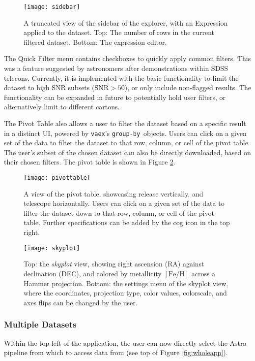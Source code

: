 \documentclass[a4paper,10pt,twocolumn]{article}
\newcommand{\vaex}{\texttt{vaex}}
\begin{document}
\begin{figure}[tp]
	\centering
	\texttt{[image: sidebar]}
	\caption{A truncated view of the sidebar of the explorer, with an Expression applied to the dataset. Top: The number of rows in the current filtered dataset. Bottom: The expression editor.}
	\label{fig:sidebar}
\end{figure}

The Quick Filter menu contains checkboxes to quickly apply common filters. This was a feature suggested by astronomers after demonstrations within SDSS telecons. Currently, it is implemented with the basic functionality to limit the dataset to high SNR subsets ($\mathrm{SNR} >50$), or only include non-flagged results. The functionality can be expanded in future to potentially hold user filters, or alternatively limit to different cartons.

The Pivot Table also allows a user to filter the dataset based on a specific result in a distinct UI, powered by \vaex's \texttt{group-by}\, objects. Users can click on a given set of the data to filter the dataset to that row, column, or cell of the pivot table. The user's subset of the chosen dataset can also be directly downloaded, based on their chosen filters. The pivot table is shown in Figure \ref{fig:pivottable}.


\begin{figure}[tp]
	\centering
	\texttt{[image: pivottable]}
	\caption{A view of the pivot table, showcasing release vertically, and telescope horizontally. Users can click on a given set of the data to filter the dataset down to that row, column, or cell of the pivot table. Further specifications can be added by the cog icon in the top right.}
	\label{fig:pivottable}
\end{figure}
\begin{figure}[tp]
	\centering
	\texttt{[image: skyplot]}
	\caption{Top: the \emph{skyplot} view, showing right ascension (RA) against declination (DEC), and colored by metallicity $\mathrm{[Fe / H]}$ across a Hammer projection. Bottom: the settings menu of the skyplot view, where the coordinates, projection type, color values, colorscale, and axes flips can be changed by the user.}
	\label{fig:skyplot}
\end{figure}

\subsubsection{Multiple Datasets}
\label{sec:datasets}
Within the top left of the application, the user can now directly select the Astra pipeline from which to access data from (see top of Figure \ref{fig:wholeapp}).
\end{document}
